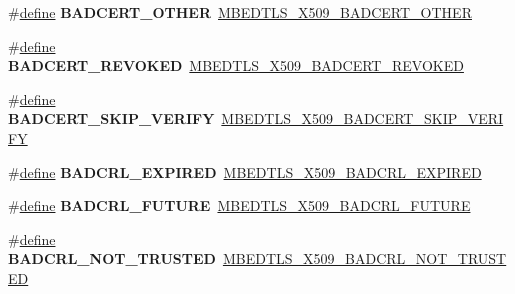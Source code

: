 \begin{DoxyCompactItemize}
\item 
\mbox{\label{compat-1_83_8h_abeaea946ef3512d85af10fd3f16b2b5f}} 
\#\hyperlink{structdefine}{define} {\bfseries B\+A\+D\+C\+E\+R\+T\+\_\+\+O\+T\+H\+ER}~\hyperlink{group__x509__module_ga76bdd50937a671ef62474b7e38e23e02}{M\+B\+E\+D\+T\+L\+S\+\_\+\+X509\+\_\+\+B\+A\+D\+C\+E\+R\+T\+\_\+\+O\+T\+H\+ER}
\item 
\mbox{\label{compat-1_83_8h_a4ecb1ad0da0f9d6bb0017e091ea4ee2a}} 
\#\hyperlink{structdefine}{define} {\bfseries B\+A\+D\+C\+E\+R\+T\+\_\+\+R\+E\+V\+O\+K\+ED}~\hyperlink{group__x509__module_gaddd96a9eb80fab17bce02d2a147ea504}{M\+B\+E\+D\+T\+L\+S\+\_\+\+X509\+\_\+\+B\+A\+D\+C\+E\+R\+T\+\_\+\+R\+E\+V\+O\+K\+ED}
\item 
\mbox{\label{compat-1_83_8h_a70f5b5dce099c759ac5a49489587c385}} 
\#\hyperlink{structdefine}{define} {\bfseries B\+A\+D\+C\+E\+R\+T\+\_\+\+S\+K\+I\+P\+\_\+\+V\+E\+R\+I\+FY}~\hyperlink{group__x509__module_ga1b87b2e1d26077023adf2a5c65a76776}{M\+B\+E\+D\+T\+L\+S\+\_\+\+X509\+\_\+\+B\+A\+D\+C\+E\+R\+T\+\_\+\+S\+K\+I\+P\+\_\+\+V\+E\+R\+I\+FY}
\item 
\mbox{\label{compat-1_83_8h_ad5d4bfa3090cb468e734596094f39a1f}} 
\#\hyperlink{structdefine}{define} {\bfseries B\+A\+D\+C\+R\+L\+\_\+\+E\+X\+P\+I\+R\+ED}~\hyperlink{group__x509__module_gaebccb1707af21f2d3d6610a7c6485f32}{M\+B\+E\+D\+T\+L\+S\+\_\+\+X509\+\_\+\+B\+A\+D\+C\+R\+L\+\_\+\+E\+X\+P\+I\+R\+ED}
\item 
\mbox{\label{compat-1_83_8h_a8dbe1ef936bb47a2f13759e7e4380be0}} 
\#\hyperlink{structdefine}{define} {\bfseries B\+A\+D\+C\+R\+L\+\_\+\+F\+U\+T\+U\+RE}~\hyperlink{group__x509__module_gad93c0f614969729f7d13fb0a3acac68e}{M\+B\+E\+D\+T\+L\+S\+\_\+\+X509\+\_\+\+B\+A\+D\+C\+R\+L\+\_\+\+F\+U\+T\+U\+RE}
\item 
\mbox{\label{compat-1_83_8h_ad3e80bd3df035edaa81dcd44da586153}} 
\#\hyperlink{structdefine}{define} {\bfseries B\+A\+D\+C\+R\+L\+\_\+\+N\+O\+T\+\_\+\+T\+R\+U\+S\+T\+ED}~\hyperlink{group__x509__module_gad1da8228ca957c2947fd329c32fc7ca4}{M\+B\+E\+D\+T\+L\+S\+\_\+\+X509\+\_\+\+B\+A\+D\+C\+R\+L\+\_\+\+N\+O\+T\+\_\+\+T\+R\+U\+S\+T\+ED}
\item 
\mbox{\label{compat-1_83_8h_a47a29de4f2d383c17ca87cf34b05f047}} 

\end{DoxyCompactItemize}
